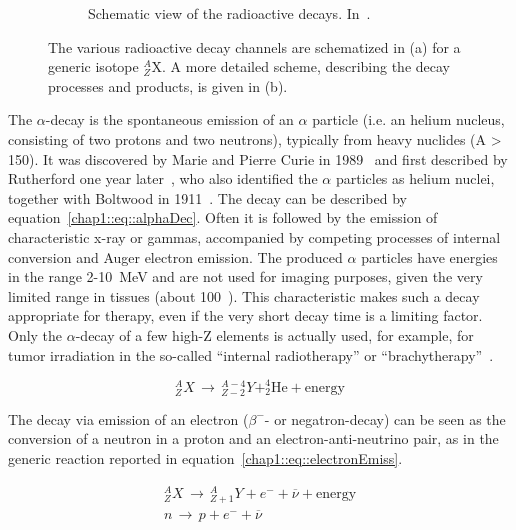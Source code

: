 \begin{figure}[!htbp]
\begin{subfigure}[t]{.64\textwidth}
\caption{Schematic view of the radioactive decays. In~\cite{Powsner2013}.}
\label{chap1::fig::nuclides}
\end{subfigure}
\caption{The various radioactive decay channels are schematized in (a) for a generic isotope $^{A}_{Z}$X. A more detailed scheme, describing the decay processes and products, is given in (b).}
\label{chap1::fig::radioactiveDecay}
\end{figure} 

The $\alpha$-decay  is the spontaneous emission of an $\alpha$ particle (i.e. an helium nucleus, consisting of two protons and two neutrons), typically from heavy nuclides (A > 150). It was discovered by Marie and Pierre Curie in 1989~\parencite{Curie1898} and first described by Rutherford one year later~\parencite{Rutherford1899}, who also identified the $\alpha$ particles as helium nuclei, together with Boltwood in 1911~\parencite{Boltwood1911}. The decay can be described by equation~\ref{chap1::eq::alphaDec}. Often it is followed by the emission of characteristic x-ray or gammas, accompanied by competing processes of internal conversion and Auger electron emission. The produced $\alpha$ particles have energies in the range 2-10~MeV and are not used for imaging purposes, given the very limited range in tissues (about 100~\charmum). This characteristic makes such a decay appropriate for therapy, even if the very short decay time is a limiting factor. Only the $\alpha$-decay of a few high-Z elements is actually used, for example, for tumor irradiation in the so-called \enquote{internal radiotherapy} or \enquote{brachytherapy}~\parencite{Suntharalingam2005, Dahiya2016}. 

\begin{equation}
^{A}_{Z}X \, \rightarrow \, ^{A-4}_{Z-2}Y + ^{4}_{2}\mathrm{He} + \mathrm{energy}
\label{chap1::eq::alphaDec}
\end{equation} 

The decay via emission of an electron  ($\beta^-$- or negatron-decay) can be seen as the conversion of a neutron in a proton and an electron-anti-neutrino pair, as in the generic reaction reported in equation~\ref{chap1::eq::electronEmiss}.

\begin{equation}\label{chap1::eq::electronEmiss}
\begin{split}
^{A}_{Z}X \, \rightarrow \, ^{A}_{Z+1}Y + e^{-} + \overline{\nu} + \mathrm{energy} \\
n \, \rightarrow \, p + e^{-} + \overline{\nu} 
\end{split}
\end{equation}   
 
